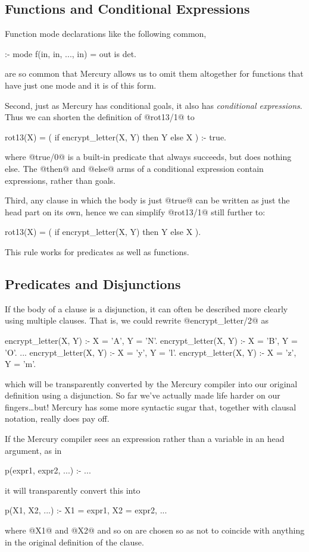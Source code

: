 \subsection{Functions and Conditional Expressions}

Function mode declarations like the following
common,
\begin{myverbatim}
:- mode f(in, in, ..., in) = out is det.
\end{myverbatim}
are so common that Mercury allows us to omit them altogether for functions
that have just one mode and it is of this form.

Second, just as Mercury has conditional goals, it also has \emph{conditional
expressions}.  Thus we can shorten the definition of @rot13/1@ to
\begin{myverbatim}
rot13(X) = ( if encrypt_letter(X, Y) then Y else X ) :-
    true.
\end{myverbatim}
where @true/0@ is a built-in predicate that always succeeds, but does
nothing else.  The @then@ and @else@ arms of a conditional expression
contain expressions, rather than goals.

Third, any clause in which the body is just @true@ can be written as
just the head part on its own, hence we can simplify @rot13/1@ still
further to:
\begin{myverbatim}
rot13(X) = ( if encrypt_letter(X, Y) then Y else X ).
\end{myverbatim}
This rule works for predicates as well as functions.

\subsection{Predicates and Disjunctions}

If the body of a clause is a disjunction, it can often be described more
clearly using multiple clauses.  That is, we could rewrite
@encrypt_letter/2@ as
\begin{myverbatim}
encrypt_letter(X, Y) :- X = 'A', Y = 'N'.
encrypt_letter(X, Y) :- X = 'B', Y = 'O'.
...
encrypt_letter(X, Y) :- X = 'y', Y = 'l'.
encrypt_letter(X, Y) :- X = 'z', Y = 'm'.
\end{myverbatim}
which will be transparently converted by the Mercury compiler into our
original definition using a disjunction.  So far we've actually made
life harder on our fingers\ldots but!  Mercury has some more
syntactic sugar that, together with clausal notation, really does pay
off.

If the Mercury compiler sees an expression rather than a variable in an
head argument, as in
\begin{myverbatim}
p(expr1, expr2, ...) :- ...
\end{myverbatim}
it will transparently convert this into
\begin{myverbatim}
p(X1, X2, ...) :- X1 = expr1, X2 = expr2, ...
\end{myverbatim}
where @X1@ and @X2@ and so on are chosen so as not to coincide with
anything in the original definition of the clause.

